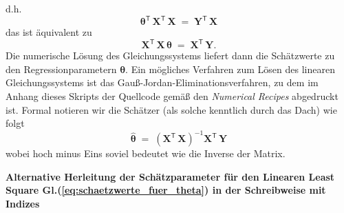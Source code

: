 d.h.
\begin{equation}
\boldsymbol{\theta}^\mathsf{T} \, \mathbf{X}^\mathsf{T}  \, \mathbf{X} \; = \;
\mathbf{Y}^\mathsf{T} \, \mathbf{X}
\end{equation}
das ist äquivalent zu
\begin{equation}
\mathbf{X}^\mathsf{T} \, \mathbf{X} \, \boldsymbol{\theta} \; = \;
\mathbf{X}^\mathsf{T} \, \mathbf{Y} .
\end{equation}
Die numerische Lösung des Gleichungssystems liefert dann die Schätzwerte zu
den Regressionparametern $\boldsymbol{\theta}$. Ein mögliches Verfahren zum
Lösen des linearen Gleichungssystems ist das Gauß-Jordan-Eliminationsverfahren, zu
dem im Anhang dieses Skripts der Quellcode gemäß den \textsl{Numerical Recipes}
\cite{Fla02} abgedruckt ist.
Formal notieren wir
die Schätzer (als solche kenntlich durch das Dach) wie folgt
\begin{equation}
\boldsymbol{\hat \theta} \; = \;
\left( \mathbf{X}^\mathsf{T}  \, \mathbf{X} \right)^{-1} \mathbf{X}^\mathsf{T} \, \mathbf{Y}
\label{eq:schaetzwerte_fuer_theta}
\end{equation}
wobei hoch minus Eins soviel bedeutet wie die Inverse der Matrix.

\textbf{Alternative Herleitung der Schätzparameter für den Linearen Least Square Gl.(\ref{eq:schaetzwerte_fuer_theta}) in der Schreibweise mit Indizes}

